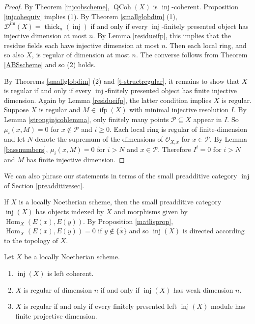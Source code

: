\documentclass[12pt,oneside]{amsart}
\DeclareMathOperator{\Hom}{Hom}
\DeclareMathOperator{\thick}{thick}
\DeclareMathOperator{\QCoh}{QCoh}
\DeclareMathOperator{\inj}{inj}
\DeclareMathOperator{\immac}{im}
\DeclareMathOperator{\ifp}{ifp}
\begin{document}
\begin{proof}
By Theorem \ref{injcohscheme}, $\QCoh(X)$ is $\inj$-coherent. Proposition \ref{injcohequiv} implies (1). By Theorem \ref{smallglobdim} (1), $\mathcal{D}^{\immac}(X) = \thick_n(\inj)$ if and only if every $\inj$-finitely presented object has injective dimension at most $n$. By Lemma \ref{residueifp}, this implies that the residue fields each have injective dimension at most $n$. Then each local ring, and so also $X$, is regular of dimension at most $n$. The converse follows from Theorem \ref{ABSscheme} and so (2) holds.

By Theorems \ref{smallglobdim} (2) and \ref{t-structregular}, it remains to show that $X$ is regular if and only if every $\inj$-finitely presented object has finite injective dimension. Again by Lemma \ref{residueifp}, the latter condition implies $X$ is regular. Suppose $X$ is regular and $M \in \ifp(X)$ with minimal injective resolution $I$. By Lemma \ref{stronginjcohlemma}, only finitely many points $\mathcal{P} \subseteq X$ appear in $I$. So $\mu_i(x,M) = 0$ for $x \not\in\mathcal{P}$ and $i \geq 0$. Each local ring is regular of finite-dimension and let $N$ denote the supremum of the dimensions of $\mathcal{O}_{X,x}$ for $x \in \mathcal{P}$. By Lemma \ref{bassnumbers}, $\mu_i(x,M) = 0$ for $i > N$ and $x \in \mathcal{P}$. Therefore $I^i = 0$ for $i > N$ and $M$ has finite injective dimension. 
\end{proof}

We can also phrase our statements in terms of the small preadditive category $\inj$ of Section \ref{preadditivesec}.


\begin{remark}
If $X$ is a locally Noetherian scheme, then the small preadditive category $\inj(X)$ has objects indexed by $X$ and morphisms given by $\Hom_X(E(x),E(y))$. By Proposition \ref{matlisprop}, $\Hom_X(E(x),E(y)) = 0$ if $y \not \in \overline{ \{x\}}$ and so $\inj(X)$ is directed according to the topology of $X$. 
\end{remark}


\begin{theorem} \label{weakdimscheme}
Let $X$ be a locally Noetherian scheme. 
\begin{enumerate}
\item $\inj(X)$ is left coherent.

\item $X$ is regular of dimension $n$ if and only if $\inj(X)$ has weak dimension $n$.

\item $X$ is regular if and only if every finitely presented left $\inj(X)$ module has finite projective dimension.
\end{enumerate}
\end{theorem}
\end{document}
